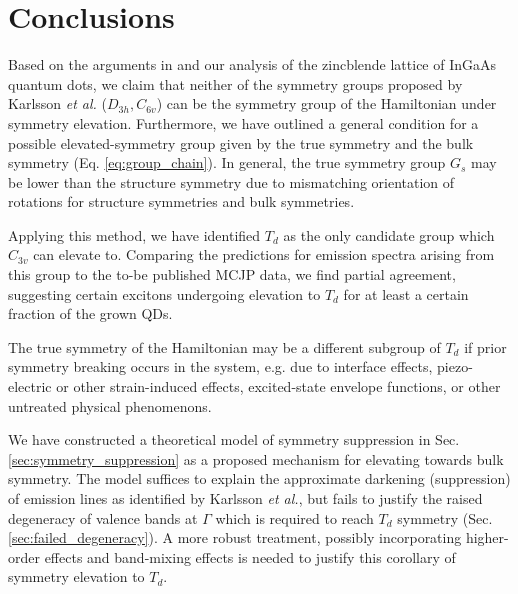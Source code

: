 \section{Conclusions} \label{sec:conclusions}


Based on the arguments in \cite{bulk_limiting} and our analysis of the zincblende lattice of InGaAs quantum dots, we claim that neither of the symmetry groups proposed by Karlsson \textit{et al.} ($D_{3h}, C_{6v}$) can be the symmetry group of the Hamiltonian under symmetry elevation. Furthermore, we have outlined a general condition for a possible elevated-symmetry group given by the true symmetry and the bulk symmetry (Eq. \ref{eq:group_chain}). In general, the true symmetry group $G_s$ may be lower than the structure symmetry due to mismatching orientation of rotations for structure symmetries and bulk symmetries.

Applying this method, we have identified $T_d$ as the only candidate group which $C_{3v}$ can elevate to. Comparing the predictions for emission spectra arising from this group to the to-be published MCJP data, we find partial agreement, suggesting certain excitons undergoing elevation to $T_d$ for at least a certain fraction of the grown QDs.

The true symmetry of the Hamiltonian may be a different subgroup of $T_d$ if prior symmetry breaking occurs in the system, e.g. due to interface effects, piezo-electric or other strain-induced effects, excited-state envelope functions, or other untreated physical phenomenons. 

We have constructed a theoretical model of symmetry suppression in Sec. \ref{sec:symmetry_suppression} as a proposed mechanism for elevating towards bulk symmetry. The model suffices to explain the approximate darkening (suppression) of emission lines as identified by Karlsson \textit{et al.}, but fails to justify the raised degeneracy of valence bands at $\Gamma$ which is required to reach $T_d$ symmetry (Sec. \ref{sec:failed_degeneracy}). A more robust treatment, possibly incorporating higher-order effects and band-mixing effects is needed to justify this corollary of symmetry elevation to $T_d$.

